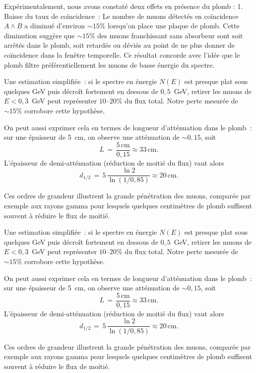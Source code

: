 \documentclass[a4paper,12pt,twoside]{article}
\begin{document}
Expérimentalement, nous avons constaté deux effets en présence du plomb :
1. Baisse du taux de coïncidence~: Le nombre de muons détectés en coïncidence $A \land B$ a diminué d'environ $\sim15\%$ lorsqu'on place une plaque de plomb. Cette diminution suggère que $\sim15\%$ des muons franchissant sans absorbeur sont soit arrêtés dans le plomb, soit retardés ou déviés au point de ne plus donner de coïncidence dans la fenêtre temporelle. Ce résultat concorde avec l'idée que le plomb filtre préférentiellement les muons de basse énergie du spectre. 

Une estimation simplifiée~: si le spectre en énergie $N(E)$ est presque plat sous quelques GeV puis décroît fortement en dessous de $0{,}5$~GeV, retirer les muons de $E<0{,}3$~GeV peut représenter $10$--$20\%$ du flux total. Notre perte mesurée de $\sim15\%$ corrobore cette hypothèse. 

On peut aussi exprimer cela en termes de longueur d'atténuation dans le plomb~: sur une épaisseur de 5~cm, on observe une atténuation de $\sim0{,}15$, soit 
\[
  L \,=\, \frac{5\,\mathrm{cm}}{0{,}15}\approx33\,\mathrm{cm} .
\]
L'épaisseur de demi-atténuation (réduction de moitié du flux) vaut alors
\[
  d_{1/2} \,=\, 5\,\frac{\ln2}{\ln(1/0{,}85)} \approx20\,\mathrm{cm} .
\]

Ces ordres de grandeur illustrent la grande pénétration des muons, comparée par exemple aux rayons gamma pour lesquels quelques centimètres de plomb suffisent souvent à réduire le flux de moitié.


Une estimation simplifiée~: si le spectre en énergie $N(E)$ est presque plat sous quelques GeV puis décroît fortement en dessous de $0{,}5$~GeV, retirer les muons de $E<0{,}3$~GeV peut représenter $10$--$20\%$ du flux total. Notre perte mesurée de $\sim15\%$ corrobore cette hypothèse. 

On peut aussi exprimer cela en termes de longueur d'atténuation dans le plomb~: sur une épaisseur de 5~cm, on observe une atténuation de $\sim0{,}15$, soit 
\[
  L \,=\, \frac{5\,\mathrm{cm}}{0{,}15}\approx33\,\mathrm{cm} .
\]
L'épaisseur de demi-atténuation (réduction de moitié du flux) vaut alors
\[
  d_{1/2} \,=\, 5\,\frac{\ln2}{\ln(1/0{,}85)} \approx20\,\mathrm{cm} .
\]

Ces ordres de grandeur illustrent la grande pénétration des muons, comparée par exemple aux rayons gamma pour lesquels quelques centimètres de plomb suffisent souvent à réduire le flux de moitié.
\end{document}
